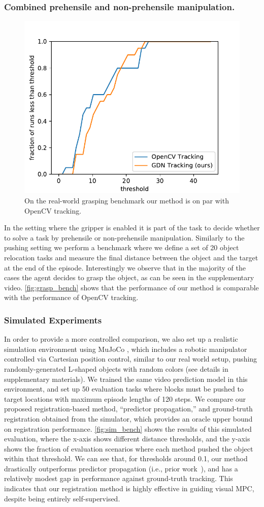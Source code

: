 \subsubsection{Combined prehensile and non-prehensile manipulation.}

\begin{figure}
\centering
\includegraphics[width=0.35\columnwidth]{images_rfr/grasping_score_cdf.pdf}
\caption{\small{On the real-world grasping benchmark our method is on par with OpenCV tracking.}}
\label{fig:grasp_bench}
\end{figure}


In the setting where the gripper is enabled it is part of the task to decide whether to solve a task by prehensile or non-prehensile manipulation. Similarly to the pushing setting we perform a benchmark where we define a set of 20 object relocation tasks and measure the final distance between the object and the target at the end of the episode. Interestingly we observe that in the majority of the cases the agent decides to grasp the object, as can be seen in the supplementary video. \autoref{fig:grasp_bench} shows that the performance of our method is comparable with the performance of OpenCV tracking.


\subsubsection{Simulated Experiments}

In order to provide a more controlled comparison, we also set up a realistic simulation environment using MuJoCo \cite{todorov2012mujoco}, which includes a robotic manipulator controlled via Cartesian position control, similar to our real world setup, pushing randomly-generated L-shaped objects with random colors (see details in supplementary materials). 
We trained the same video prediction model in this environment, and set up 50 evaluation tasks where blocks must be pushed to target locations with maximum episode lengths of 120 steps. 
We  compare our proposed registration-based method, ``predictor propagation,'' and ground-truth registration obtained from the simulator, which provides an oracle upper bound on registration performance. \autoref{fig:sim_bench} shows the results of this simulated evaluation, where the x-axis shows different distance thresholds, and the y-axis shows the fraction of evaluation scenarios where each method pushed the object within that threshold. We can see that, for thresholds around 0.1, our method drastically outperforms predictor propagation (i.e., prior work~\cite{sna}), and has a relatively modest gap in performance against ground-truth tracking. This indicates that our registration method is highly effective in guiding visual MPC, despite being entirely self-supervised.

